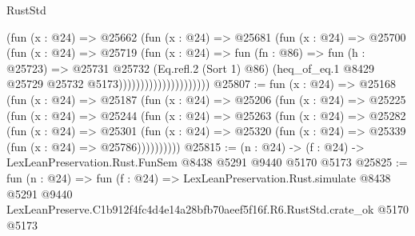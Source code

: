 \begin{lexlean}{RustStd}
\begin{coremodule}
                                  (fun (x : @24) =>
                                  @25662
                                    (fun (x : @24) =>
                                    @25681
                                      (fun (x : @24) =>
                                      @25700
                                        (fun (x : @24) =>
                                        @25719
                                          (fun (x : @24) =>
                                          fun (fn : @86) =>
                                          fun (h : @25723) =>
                                          @25731
                                            @25732
                                            (Eq.refl.{2} (Sort 1) @86)
                                            (heq_of_eq.{1}
                                              @8429
                                              @25729
                                              @25732
                                              @5173)))))))))))))))))))))
@25807 := fun (x : @24) =>
  @25168
    (fun (x : @24) =>
    @25187
      (fun (x : @24) =>
      @25206
        (fun (x : @24) =>
        @25225
          (fun (x : @24) =>
          @25244
            (fun (x : @24) =>
            @25263
              (fun (x : @24) =>
              @25282
                (fun (x : @24) =>
                @25301
                  (fun (x : @24) =>
                  @25320 (fun (x : @24) => @25339 (fun (x : @24) => @25786))))))))))
@25815 := (n : @24) -> (f : @24) -> LexLeanPreservation.Rust.FunSem @8438 @5291 @9440 @5170 @5173
@25825 := fun (n : @24) =>
  fun (f : @24) =>
  LexLeanPreservation.Rust.simulate
    @8438
    @5291
    @9440
    LexLeanPreserve.C1b912f4fc4d4e14a28bfb70aeef5f16f.R6.RustStd.crate_ok
    @5170
    @5173
\end{coremodule}
\end{lexlean}
